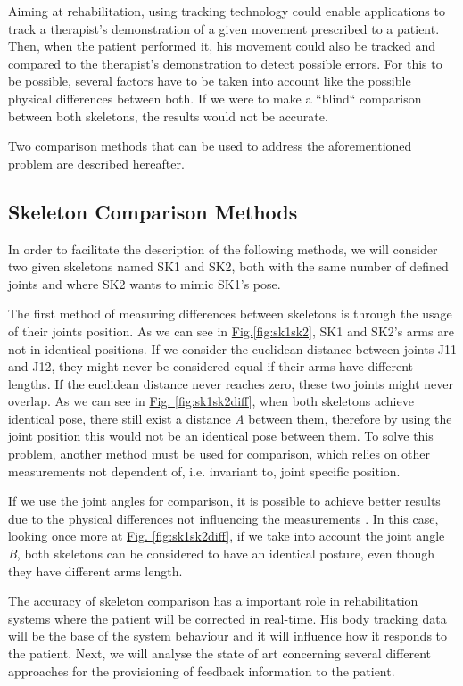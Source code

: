 Aiming at rehabilitation, using tracking technology could enable applications to track a therapist's demonstration of a given movement prescribed to a patient.
Then, when the patient performed it, his movement could also be tracked and compared to the therapist's demonstration to detect possible errors.
For this to be possible, several factors have to be taken into account like the possible physical differences between both. If we were to make a ``blind`` comparison between both skeletons, the results would not be accurate.

Two comparison methods that can be used to address the aforementioned problem are described hereafter.

\subsection{Skeleton Comparison Methods}

In order to facilitate the description of the following methods, we will consider two given skeletons named SK1 and SK2, both with the same number of defined joints and where SK2 wants to mimic SK1's pose.

The first method of measuring differences between skeletons is through the usage of their joints position. 
As we can see in \hyperref[fig:sk1sk2]{Fig.\ref{fig:sk1sk2}}, SK1 and SK2's arms are not in identical positions. 
If we consider the euclidean distance between joints J11 and J12, they might never be considered equal if their arms have different lengths. 
If the euclidean distance never reaches zero, these two joints might never overlap. As we can see in \hyperref[fig:sk1sk2diff]{Fig. \ref{fig:sk1sk2diff}}, 
when both skeletons achieve identical pose, there still exist a distance \textit{A} between them, therefore by using the joint position 
this would not be an identical pose between them.
To solve this problem, another method must be used for comparison, 
which relies on other measurements not dependent of, i.e. invariant to, joint specific position. 

If we use the joint angles for comparison, it is possible to achieve better results due to 
the physical differences not influencing the measurements \cite{Borghese2013}. 
In this case, looking once more at \hyperref[fig:sk1sk2diff]{Fig. \ref{fig:sk1sk2diff}}, 
if we take into account the joint angle \textit{B}, both skeletons can be considered to have an identical posture, even though they have different arms length.

The accuracy of skeleton comparison has a important role in rehabilitation systems 
where the patient will be corrected in real-time. His body tracking data will be the 
base of the system behaviour and it will influence how it responds to the patient. 
Next, we will analyse the state of art concerning several different approaches for 
the provisioning of feedback information to the patient.

